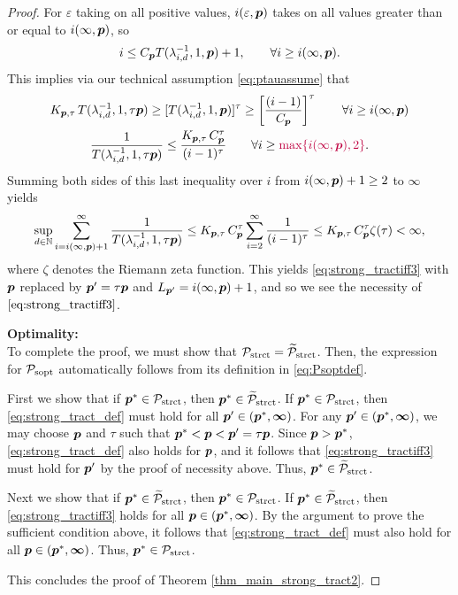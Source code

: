 \documentclass[11pt,a4paper]{article}
\newcommand{\peter}[1]{\begingroup\color{purple}#1\endgroup}
\newcommand{\vinfty}{\boldsymbol{\infty}}
\begin{document}
\begin{proof}
For $\varepsilon$ taking on all positive values, $i(\varepsilon,\boldsymbol{p})$ takes on all values greater than or equal to $i(\infty,\boldsymbol{p})$, so
\[
i\le C_{\boldsymbol{p}} T(\lambda_{i,d}^{-1},1,\boldsymbol{p})+1, \qquad \forall i \ge i(\infty,\boldsymbol{p}).
\]
This implies via our technical assumption \eqref{eq:ptauassume} that
\begin{gather*}
 K_{\vp,\tau}\,T (\lambda_{i,d}^{-1},1,\tau \vp) \ge
 [T(\lambda_{i,d}^{-1},1, \vp)]^\tau
 \ge
  \left[\frac{(i-1)}{C_{\vp}}\right]^\tau \qquad \forall i \ge i(\infty,\vp) \\
 \frac{1}{T (\lambda_{i,d}^{-1},1,\tau \vp)} \le
\frac{K_{\vp,\tau}\, C_{\vp}^\tau}{(i-1)^\tau}\qquad \forall i \ge \peter{\max\{i(\infty,\vp),2\}} .
\end{gather*}
Summing both sides of this last inequality over $i$ from $i(\infty,\boldsymbol{p}) +1 \ge 2$ to $\vinfty$ yields
\begin{equation*}
\sup_{d\in\mathbb{N}} \sum_{i=i(\infty,\boldsymbol{p}) +1 }^\infty \frac{1}{T (\lambda_{i,d}^{-1},1, \tau \boldsymbol{p})}
 \le  K_{\boldsymbol{p},\tau}\, C_{\boldsymbol{p}}^\tau
\sum_{i=2}^\infty \frac{1}{(i-1)^\tau} \\
 \le K_{\boldsymbol{p},\tau}\, C_{\boldsymbol{p}}^\tau
\zeta (\tau)  < \infty,
\end{equation*}
where $\zeta$ denotes the Riemann zeta function.
This yields \eqref{eq:strong_tractiff3} with $\boldsymbol{p}$ replaced by $\boldsymbol{p}' = \tau \boldsymbol{p}$ and $L_{\boldsymbol{p}'} = i(\infty,\boldsymbol{p}) +1$, and so we see the necessity of $\eqref{eq:strong_tractiff3}$.

\bigskip
\noindent \textbf{Optimality:} \\
To complete the proof, we must show that $\mathcal{P}_{\textup{strct}} = \widetilde{\mathcal{P}}_{\textup{strct}}$.  Then, the expression for  $\mathcal{P}_{\textup{sopt}}$ automatically follows from its definition in \eqref{eq:Psoptdef}.

First we show  that if $\boldsymbol{p}^* \in \mathcal{P}_{\textup{strct}}$, then $\boldsymbol{p}^* \in \widetilde{\mathcal{P}}_{\textup{strct}}$.  If $\boldsymbol{p}^* \in \mathcal{P}_{\textup{strct}}$, then \eqref{eq:strong_tract_def} must hold for all $\vp' \in (\vp^*,\vinfty)$.  For any $\vp' \in (\vp^*,\vinfty)$, we may choose $\boldsymbol{p}$ and $\tau$ such that $\boldsymbol{p}^* < \boldsymbol{p} < \boldsymbol{p}' = \tau \boldsymbol{p}$. Since $\boldsymbol{p} > \boldsymbol{p}^*$, \eqref{eq:strong_tract_def} also holds for $\boldsymbol{p}$, and it follows that \eqref{eq:strong_tractiff3} must hold for $\boldsymbol{p}'$ by the proof of necessity above.  Thus, $\boldsymbol{p}^* \in \widetilde{\mathcal{P}}_{\textup{strct}}$.

Next we show that if $\boldsymbol{p}^* \in \widetilde{\mathcal{P}}_{\textup{strct}}$, then $\boldsymbol{p}^* \in \mathcal{P}_{\textup{strct}}$.  If $\boldsymbol{p}^* \in \widetilde{\mathcal{P}}_{\textup{strct}}$, then \eqref{eq:strong_tractiff3}  holds for all $\vp \in (\vp^*,\vinfty)$.  By the argument to prove the sufficient condition above, it follows that \eqref{eq:strong_tract_def} must also hold for all $\vp \in (\vp^*,\vinfty)$. Thus, $\boldsymbol{p}^* \in \mathcal{P}_{\textup{strct}}$.

\bigskip

\noindent This concludes the proof of  Theorem \ref{thm_main_strong_tract2}.

\end{proof}
\end{document}
